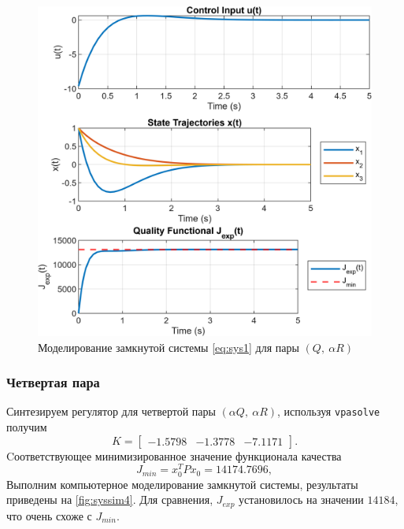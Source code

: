 \begin{figure}[H]
    \centering
    \includegraphics[width=1\linewidth]{figs/1_sim3.png}
    \caption{Моделирование замкнутой системы \eqref{eq:sys1} для пары $(Q,\ \alpha R)$}
    \label{fig:syssim3}
\end{figure}

\newpage\subsubsection{Четвертая пара}

Синтезируем регулятор для четвертой пары $(\alpha Q,\ \alpha R)$, используя \texttt{vpasolve}
получим
\begin{equation*}
    K=\begin{bmatrix}
        -1.5798  & -1.3778 &  -7.1171
    \end{bmatrix}.
\end{equation*}
Cоответствующее минимизированное значение функционала качества
\begin{equation*}
    J_{min}=x_0^TPx_0=14174.7696,
\end{equation*}
Выполним компьютерное моделирование замкнутой системы,
результаты приведены на \autoref{fig:syssim4}. Для сравнения, $J_{exp}$ установилось на
значении $14184$, что очень схоже с $J_{min}$.

